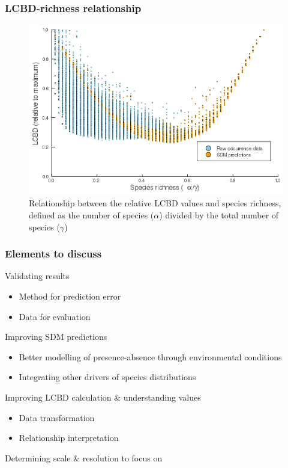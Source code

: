 \documentclass[10pt]{beamer}
\begin{document}
\begin{frame}
  \frametitle{LCBD-richness relationship}
  \begin{figure}
    \centering
    \includegraphics[scale=0.4]{fig/06_cmb_relation-oneplot.png}
    \caption{Relationship between the relative LCBD values and species richness, defined as the number of species ($\alpha$) divided by the total number of species ($\gamma$)}
  \end{figure}
\end{frame}

\begin{frame}
  \frametitle{Elements to discuss}
  \vfill
  Validating results
  \begin{itemize}
    \item Method for prediction error
    \item Data for evaluation
  \end{itemize}
  \vfill
  Improving SDM predictions
  \begin{itemize}
    \item Better modelling of presence-absence through environmental conditions
    \item Integrating other drivers of species distributions
  \end{itemize}
  \vfill
  Improving LCBD calculation \& understanding values
  \begin{itemize}
    \item Data transformation
    \item Relationship interpretation
  \end{itemize}
  \vfill
  Determining scale \& resolution to focus on
  \vfill
\end{frame}
\end{document}
